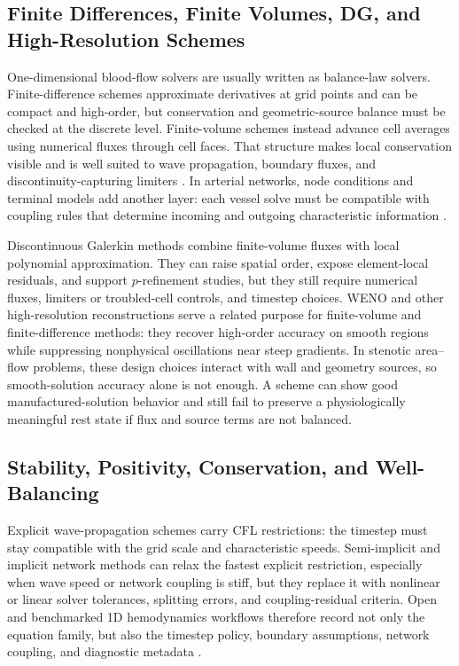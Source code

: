 \subsection{Finite Differences, Finite Volumes, DG, and High-Resolution Schemes}
\label{subsec:numerical-methods-balance-law-families}

One-dimensional blood-flow solvers are usually written as balance-law solvers.
Finite-difference schemes approximate derivatives at grid points and can be
compact and high-order, but conservation and geometric-source balance must be
checked at the discrete level. Finite-volume schemes instead advance cell
averages using numerical fluxes through cell faces. That structure makes local
conservation visible and is well suited to wave propagation, boundary fluxes,
and discontinuity-capturing limiters
\cite{LeVeque2002FiniteVolumeMethodsForHyperbolicProblems}. In arterial
networks, node conditions and terminal models add another layer: each vessel
solve must be compatible with coupling rules that determine incoming and
outgoing characteristic information \cite{Wang2014BloodFlowNetworks}.

Discontinuous Galerkin methods combine finite-volume fluxes with local
polynomial approximation. They can raise spatial order, expose element-local
residuals, and support $p$-refinement studies, but they still require numerical
fluxes, limiters or troubled-cell controls, and timestep choices. WENO and other
high-resolution reconstructions serve a related purpose for finite-volume and
finite-difference methods: they recover high-order accuracy on smooth regions
while suppressing nonphysical oscillations near steep gradients. In stenotic
area--flow problems, these design choices interact with wall and geometry
sources, so smooth-solution accuracy alone is not enough. A scheme can show good
manufactured-solution behavior and still fail to preserve a physiologically
meaningful rest state if flux and source terms are not balanced.

\subsection{Stability, Positivity, Conservation, and Well-Balancing}
\label{subsec:numerical-methods-stability-positivity-balance}

Explicit wave-propagation schemes carry CFL restrictions: the timestep must stay
compatible with the grid scale and characteristic speeds. Semi-implicit and
implicit network methods can relax the fastest explicit restriction, especially
when wave speed or network coupling is stiff, but they replace it with nonlinear
or linear solver tolerances, splitting errors, and coupling-residual criteria.
Open and benchmarked 1D hemodynamics workflows therefore record not only the
equation family, but also the timestep policy, boundary assumptions, network
coupling, and diagnostic metadata
\cite{BoileauEtAl2015Benchmark,BenemeritoEtAl2024OpenBF,BeckersKolbe2025LaxFriedrichsHemodynamics,
LuccaEtAl2025FFRPrediction}.

